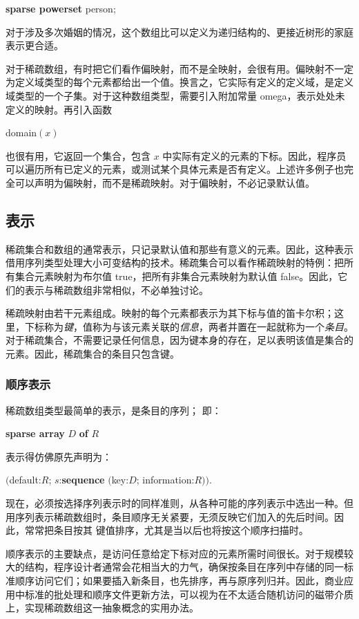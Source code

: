 \documentclass[twoside,11pt,fontset=none]{ctexbook}
\begin{document}
\tabto*{9.2em}\textbf{sparse powerset} person;

\noindent
对于涉及多次婚姻的情况，这个数组比可以定义为递归结构的、更接近树形的家庭表示更合适。

对于稀疏数组，有时把它们看作偏映射，而不是全映射，会很有用。偏映射不一定为定义域类型的每个元素都给出一个值。换言之，它实际有定义的定义域，是定义域类型的一个子集。对于这种数组类型，需要引入附加常量 omega，表示处处未定义的映射。再引入函数

\quad domain$(x)$

\noindent
也很有用，它返回一个集合，包含 $x$ 中实际有定义的元素的下标。因此，程序员可以遍历所有已定义的元素，或测试某个具体元素是否有定义。上述许多例子也完全可以声明为偏映射，而不是稀疏映射。对于偏映射，不必记录默认值。

\subsection{表示}

\noindent
稀疏集合和数组的通常表示，只记录默认值和那些有意义的元素。因此，这种表示借用序列类型处理大小可变结构的技术。稀疏集合可以看作稀疏映射的特例：把所有集合元素映射为布尔值 true，把所有非集合元素映射为默认值 false。因此，它们的表示与稀疏数组非常相似，不必单独讨论。

稀疏映射由若干元素组成。映射的每个元素都表示为其下标与值的笛卡尔积；这里，下标称为\textit{键}，值称为与该元素关联的\textit{信息}，两者并置在一起就称为一个\textit{条目}。对于稀疏集合，不需要记录任何信息，因为键本身的存在，足以表明该值是集合的元素。因此，稀疏集合的条目只包含键。

\subsubsection{顺序表示}

稀疏数组类型最简单的表示，是条目的序列；
即：

\quad \textbf{sparse array} $D$ \textbf{of} $R$

\noindent
表示得仿佛原先声明为：

\quad $($default:$R$; $s$:\textbf{sequence} $($key:$D$; information:$R))$.

现在，必须按选择序列表示时的同样准则，从各种可能的序列表示中选出一种。但用序列表示稀疏数组时，条目顺序无关紧要，无须反映它们加入的先后时间。因此，常常把条目按其
键值排序，尤其是当以后也将按这个顺序扫描时。

顺序表示的主要缺点，是访问任意给定下标对应的元素所需时间很长。对于规模较大的结构，程序设计者通常会花相当大的力气，确保按条目在序列中存储的同一标准顺序访问它们；如果要插入新条目，也先排序，再与原序列归并。因此，商业应用中标准的批处理和顺序文件更新方法，可以视为在不太适合随机访问的磁带介质上，实现稀疏数组这一抽象概念的实用办法。
\end{document}
